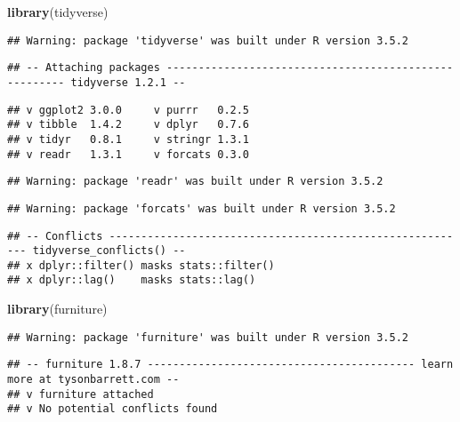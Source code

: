 \documentclass[]{article}
\newenvironment{Shaded}{\begin{snugshade}}{\end{snugshade}}
\newcommand{\KeywordTok}[1]{\textcolor[rgb]{0.13,0.29,0.53}{\textbf{#1}}}
\newcommand{\NormalTok}[1]{#1}
\begin{document}
\begin{Shaded}
\begin{Highlighting}[]
\KeywordTok{library}\NormalTok{(tidyverse)}
\end{Highlighting}
\end{Shaded}

\begin{verbatim}
## Warning: package 'tidyverse' was built under R version 3.5.2
\end{verbatim}

\begin{verbatim}
## -- Attaching packages ------------------------------------------------------ tidyverse 1.2.1 --
\end{verbatim}

\begin{verbatim}
## v ggplot2 3.0.0     v purrr   0.2.5
## v tibble  1.4.2     v dplyr   0.7.6
## v tidyr   0.8.1     v stringr 1.3.1
## v readr   1.3.1     v forcats 0.3.0
\end{verbatim}

\begin{verbatim}
## Warning: package 'readr' was built under R version 3.5.2
\end{verbatim}

\begin{verbatim}
## Warning: package 'forcats' was built under R version 3.5.2
\end{verbatim}

\begin{verbatim}
## -- Conflicts --------------------------------------------------------- tidyverse_conflicts() --
## x dplyr::filter() masks stats::filter()
## x dplyr::lag()    masks stats::lag()
\end{verbatim}

\begin{Shaded}
\begin{Highlighting}[]
\KeywordTok{library}\NormalTok{(furniture)}
\end{Highlighting}
\end{Shaded}

\begin{verbatim}
## Warning: package 'furniture' was built under R version 3.5.2
\end{verbatim}

\begin{verbatim}
## -- furniture 1.8.7 ------------------------------------------ learn more at tysonbarrett.com --
## v furniture attached
## v No potential conflicts found
\end{verbatim}
\end{document}
